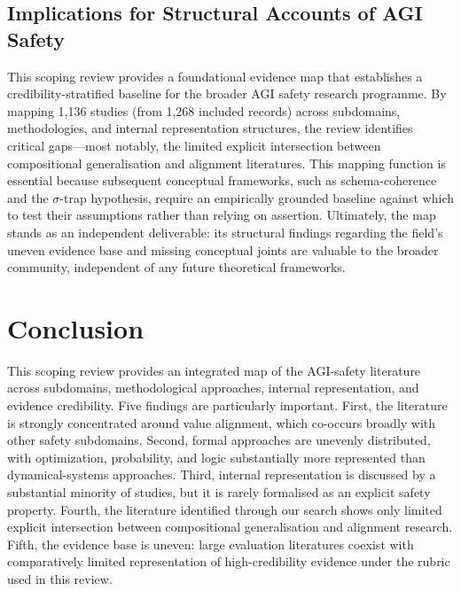 \subsection{Implications for Structural Accounts of AGI Safety}
This scoping review provides a foundational evidence map that establishes a credibility-stratified baseline for the broader AGI safety research programme. By mapping 1,136 studies (from 1,268 included records) across subdomains, methodologies, and internal representation structures, the review identifies critical gaps---most notably, the limited explicit intersection between compositional generalisation and alignment literatures. This mapping function is essential because subsequent conceptual frameworks, such as schema-coherence and the $\sigma$-trap hypothesis, require an empirically grounded baseline against which to test their assumptions rather than relying on assertion. Ultimately, the map stands as an independent deliverable: its structural findings regarding the field's uneven evidence base and missing conceptual joints are valuable to the broader community, independent of any future theoretical frameworks.

\section{Conclusion}\label{sec:conclusion}

This scoping review provides an integrated map of the AGI-safety literature across subdomains, methodological approaches, internal representation, and evidence credibility. Five findings are particularly important. First, the literature is strongly concentrated around value alignment, which co-occurs broadly with other safety subdomains. Second, formal approaches are unevenly distributed, with optimization, probability, and logic substantially more represented than dynamical-systems approaches. Third, internal representation is discussed by a substantial minority of studies, but it is rarely formalised as an explicit safety property. Fourth, the literature identified through our search shows only limited explicit intersection between compositional generalisation and alignment research. Fifth, the evidence base is uneven: large evaluation literatures coexist with comparatively limited representation of high-credibility evidence under the rubric used in this review.

